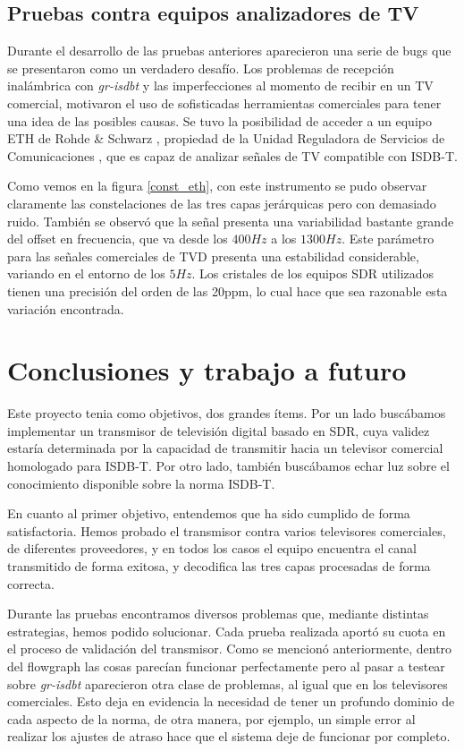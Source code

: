 \documentclass[journal,comsoc]{IEEEtran}
\begin{document}
\subsection{Pruebas contra equipos analizadores de TV}

Durante el desarrollo de las pruebas anteriores aparecieron una serie de bugs que se presentaron como un verdadero desafío. Los problemas de recepción inalámbrica con \textit{gr-isdbt} y las imperfecciones al  momento de recibir en un TV comercial, motivaron el uso de sofisticadas herramientas comerciales para tener una idea de las posibles causas. Se tuvo la posibilidad de acceder a un equipo ETH de Rohde \& Schwarz \cite{Rohde}, propiedad de la Unidad Reguladora de Servicios de Comunicaciones \cite{ursec}, que es capaz de analizar señales de TV compatible con ISDB-T.



Como vemos en la figura \ref{const_eth}, con este instrumento se pudo observar claramente las constelaciones de las tres capas jerárquicas pero con demasiado ruido. También se observó que la señal presenta una variabilidad bastante grande del offset en frecuencia, que va desde los $400Hz$ a los $1300Hz$. Este parámetro para las señales comerciales de TVD presenta una estabilidad considerable, variando en el entorno de los $5Hz$. Los cristales de los equipos SDR utilizados tienen una precisión del orden de las 20ppm, lo cual hace que sea razonable esta variación encontrada.




\section{Conclusiones y trabajo a futuro}
Este proyecto tenia como objetivos, dos grandes ítems. Por un lado buscábamos implementar un transmisor de televisión digital basado en SDR, cuya validez estaría determinada por la capacidad de transmitir hacia un televisor comercial homologado para ISDB-T. Por otro lado, también buscábamos echar luz sobre el conocimiento disponible sobre la norma ISDB-T. 

En cuanto al primer objetivo, entendemos que ha sido cumplido de forma satisfactoria. Hemos probado el transmisor contra varios televisores comerciales, de diferentes proveedores, y en todos los casos el equipo encuentra el canal transmitido de forma exitosa, y decodifica las tres capas procesadas de forma correcta. 

Durante las pruebas encontramos diversos problemas que, mediante distintas estrategias, hemos podido solucionar. Cada prueba realizada aportó su cuota en el proceso de validación del transmisor. Como se mencionó anteriormente, dentro del flowgraph las cosas parecían funcionar perfectamente pero al pasar a testear sobre \textit{gr-isdbt} aparecieron otra clase de problemas, al igual que en los televisores comerciales. Esto deja en evidencia la necesidad de tener un profundo dominio de cada aspecto de la norma, de otra manera, por ejemplo, un simple error al realizar los ajustes de atraso hace que el sistema deje de funcionar por completo.
\end{document}
